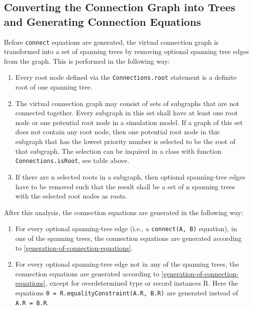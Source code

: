 \subsection{Converting the Connection Graph into Trees and Generating Connection Equations}\label{converting-the-connection-graph-into-trees-and-generating-connection-equations}

Before \lstinline!connect! equations are generated, the virtual connection
graph is transformed into a set of spanning trees by removing optional spanning tree edges
from the graph. This is performed in the following way:
\begin{enumerate}
\item
  Every root node defined via the \lstinline!Connections.root! statement is
  a definite root of one spanning tree.
\item
  The virtual connection graph may consist of sets of subgraphs that are
  not connected together. Every subgraph in this set shall have at least
  one root node or one potential root node in a simulation model. If a
  graph of this set does not contain any root node, then one potential
  root node in this subgraph that has the lowest priority number is
  selected to be the root of that subgraph. The selection can be
  inquired in a class with function \lstinline!Connections.isRoot!, see table
  above.
\item
  If there are n selected roots in a subgraph, then optional spanning-tree edges
  have to be removed such that the result shall be a set of n spanning
  trees with the selected root nodes as roots.
\end{enumerate}

After this analysis, the connection equations are generated in the
following way:
\begin{enumerate}
\item
  For every optional spanning-tree edge (i.e., a \lstinline!connect(A, B)!
  equation), in one of the spanning trees, the connection
  equations are generated according to \cref{generation-of-connection-equations}.
\item
  For every optional spanning-tree edge not in any of the spanning trees, the
  connection equations are generated according to \cref{generation-of-connection-equations}, except
  for overdetermined type or record instances R. Here the equations
  \lstinline!0 = R.equalityConstraint(A.R, B.R)! are generated instead
  of \lstinline!A.R = B.R!.
\end{enumerate}

